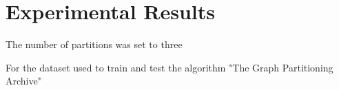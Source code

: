 %
%
\let\textcircled=\pgftextcircled
\chapter{Experimental Results}
\label{Chapter4}
The number of partitions was set to three 

For the dataset used to train and test the algorithm "The Graph Partitioning Archive"~\cite{archive}


